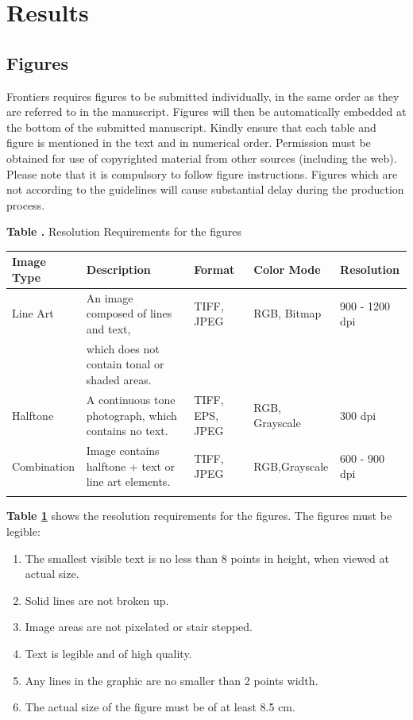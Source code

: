 \documentclass{frontiersSCNS} %
\begin{document}



\section{Results}

\subsection{Figures}
Frontiers requires figures to be submitted individually, in the same order as they are referred to in the manuscript. Figures will then be automatically embedded at the bottom of the submitted manuscript. Kindly ensure that each table and figure is mentioned in the text and in numerical order. Permission must be obtained for use of copyrighted material from other sources (including the web). Please note that it is compulsory to follow figure instructions. Figures which are not according to the guidelines will cause substantial delay during the production process.


\begin{table}[!t]
\textbf{\label{Tab:02} Table .}{ Resolution Requirements for the figures}

\processtable{}
{\begin{tabular}{lllll}\toprule
Image Type & Description & Format & Color Mode & Resolution\\\midrule
Line Art & An image composed of lines and text,  & TIFF, JPEG & RGB, Bitmap & 900 - 1200 dpi\\
           & which does not contain tonal or shaded areas.& & &\\
           Halftone & A continuous tone photograph, which contains no text. & TIFF, EPS, JPEG & RGB, Grayscale & 300 dpi\\
Combination & Image contains halftone + text or line art elements. & TIFF, JPEG & RGB,Grayscale & 600 - 900 dpi\\\botrule
\end{tabular}}{}
\end{table}

\textbf{Table \ref{Tab:02}} shows the resolution requirements for the figures. The figures must be legible:
\begin{enumerate}
\item The smallest visible text is no less than 8 points in height, when viewed at actual size.
\item Solid lines are not broken up.
\item Image areas are not pixelated or stair stepped.
\item Text is legible and of high quality.
\item Any lines in the graphic are no smaller than 2 points width.
\item The actual size of the figure must be of at least 8.5 cm.
\end{enumerate}
\end{document}
